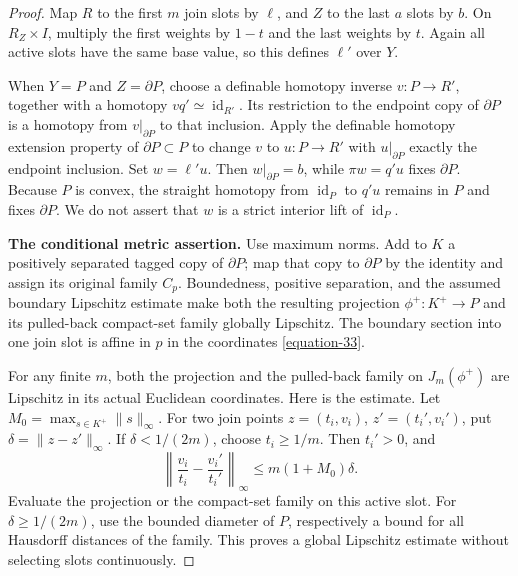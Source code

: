 \documentclass[11pt,a4paper]{article}
\theoremstyle{definition}
\begin{document}
\begin{proof}
Map \(R\) to the first \(m\) join slots by \(\ell\), and \(Z\) to the last \(a\) slots by \(b\). On \(R_Z\times I\), multiply the first weights by \(1-t\) and the last weights by \(t\). Again all active slots have the same base value, so this defines \(\ell'\) over \(Y\).

When \(Y=P\) and \(Z=\partial P\), choose a definable homotopy inverse \(v:P\to R'\), together with a homotopy \(v q'\simeq\operatorname{id}_{R'}\). Its restriction to the endpoint copy of \(\partial P\) is a homotopy from \(v|_{\partial P}\) to that inclusion. Apply the definable homotopy extension property of \(\partial P\subset P\) to change \(v\) to \(u:P\to R'\) with \(u|_{\partial P}\) exactly the endpoint inclusion. Set \(w=\ell'u\). Then \(w|_{\partial P}=b\), while \(\pi w=q'u\) fixes \(\partial P\). Because \(P\) is convex, the straight homotopy from \(\operatorname{id}_P\) to \(q'u\) remains in \(P\) and fixes \(\partial P\). We do not assert that \(w\) is a strict interior lift of \(\operatorname{id}_P\).

\textbf{The conditional metric assertion.}
Use maximum norms. Add to \(K\) a positively separated tagged copy of \(\partial P\); map that copy to \(\partial P\) by the identity and assign its original family \(C_p\). Boundedness, positive separation, and the assumed boundary Lipschitz estimate make both the resulting projection \(\phi^+:K^+\to P\) and its pulled-back compact-set family globally Lipschitz. The boundary section into one join slot is affine in \(p\) in the coordinates \eqref{equation-33}.

For any finite \(m\), both the projection and the pulled-back family on \(J_m(\phi^+)\) are Lipschitz in its actual Euclidean coordinates. Here is the estimate. Let \(M_0=\max_{s\in K^+}\|s\|_\infty\). For two join points \(z=(t_i,v_i)\), \(z'=(t_i',v_i')\), put \(\delta=\|z-z'\|_\infty\). If \(\delta<1/(2m)\), choose \(t_i\ge1/m\). Then \(t_i'>0\), and
\begin{equation}
 \left\|\frac{v_i}{t_i}-\frac{v_i'}{t_i'}\right\|_\infty
 \le m(1+M_0)\delta.
 \label{equation-38}
\end{equation}
Evaluate the projection or the compact-set family on this active slot. For \(\delta\ge1/(2m)\), use the bounded diameter of \(P\), respectively a bound for all Hausdorff distances of the family. This proves a global Lipschitz estimate without selecting slots continuously.


\end{proof}
\end{document}
